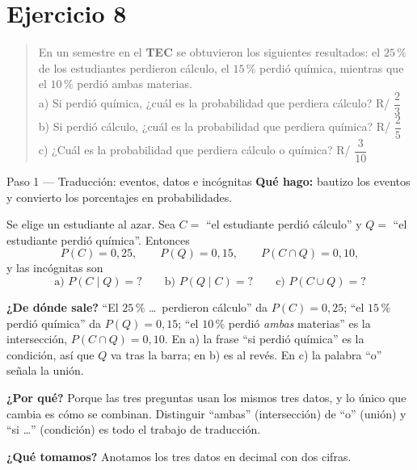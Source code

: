\documentclass[11pt]{article}
\begin{document}
\section*{Ejercicio 8}

\begin{quote}
En un semestre en el \textbf{TEC} se obtuvieron los siguientes resultados: el $25\,\%$ de los estudiantes perdieron cálculo, el $15\,\%$ perdió química, mientras que el $10\,\%$ perdió ambas materias.\\
a) Si perdió química, ¿cuál es la probabilidad que perdiera cálculo? \hfill R/ $\dfrac{2}{3}$\\
b) Si perdió cálculo, ¿cuál es la probabilidad que perdiera química? \hfill R/ $\dfrac{2}{5}$\\
c) ¿Cuál es la probabilidad que perdiera cálculo o química? \hfill R/ $\dfrac{3}{10}$
\end{quote}

\begin{paso}{Paso 1 --- Traducción: eventos, datos e incógnitas}
\textbf{Qué hago:} bautizo los eventos y convierto los porcentajes en probabilidades.

Se elige un estudiante al azar. Sea $C=$ ``el estudiante perdió cálculo'' y $Q=$ ``el estudiante perdió química''. Entonces
\[
P(C)=0{,}25,\qquad P(Q)=0{,}15,\qquad P(C\cap Q)=0{,}10,
\]
y las incógnitas son
\[
\text{a) } P(C\mid Q)=?
\qquad
\text{b) } P(Q\mid C)=?
\qquad
\text{c) } P(C\cup Q)=?
\]

\textbf{¿De dónde sale?} ``El $25\,\%$ \dots\ perdieron cálculo'' da $P(C)=0{,}25$; ``el $15\,\%$ perdió química'' da $P(Q)=0{,}15$; ``el $10\,\%$ perdió \emph{ambas} materias'' es la intersección, $P(C\cap Q)=0{,}10$. En a) la frase ``si perdió química'' es la condición, así que $Q$ va tras la barra; en b) es al revés. En c) la palabra ``o'' señala la unión.

\textbf{¿Por qué?} Porque las tres preguntas usan los mismos tres datos, y lo único que cambia es cómo se combinan. Distinguir ``ambas'' (intersección) de ``o'' (unión) y ``si \dots'' (condición) es todo el trabajo de traducción.

\textbf{¿Qué tomamos?} Anotamos los tres datos en decimal con dos cifras.
\end{paso}
\end{document}
